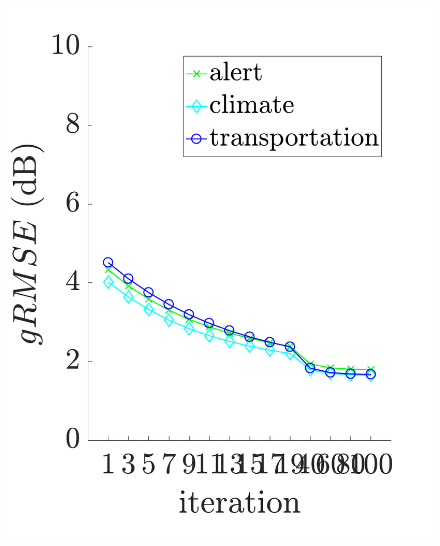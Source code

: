 \documentclass[twocolumn,a4paper,10pt]{article}
\begin{document}
\begin{figure}[!t]
\centering
	\begin{minipage}[t]{.24\textwidth}
		\centering
		\includegraphics[width=\linewidth]{../image/AmbianceNmfSupervised_EarlyStop_TPR6.pdf} 
	\end{minipage}
	\begin{minipage}[t]{.24\textwidth}
		\centering

\end{minipage}
\end{figure}
\end{document}
